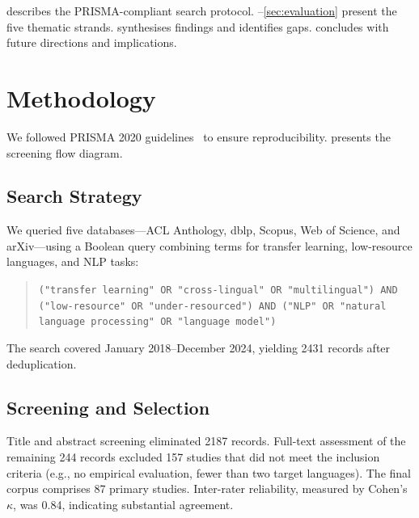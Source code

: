 \documentclass[
    language=english,
    doctype=article,
    institution=none,
    titlestyle=book,
]{../../omnilatex}
\begin{document}
 describes the PRISMA-compliant search protocol.
--\ref{sec:evaluation} present the five thematic
strands.   synthesises findings and identifies gaps.
 concludes with future directions and implications.

\section{Methodology}
\label{sec:methodology}
We followed PRISMA 2020 guidelines~\cite{page2021prisma} to ensure
reproducibility.   presents the screening flow diagram.

\subsection{Search Strategy}
We queried five databases---ACL Anthology, dblp, Scopus, Web of Science, and
arXiv---using a Boolean query combining terms for transfer learning, low-resource
languages, and NLP tasks:

\begin{quote}
\texttt{("transfer learning" OR "cross-lingual" OR "multilingual") AND
("low-resource" OR "under-resourced") AND ("NLP" OR "natural language
processing" OR "language model")}
\end{quote}

The search covered January 2018--December 2024, yielding 2431 records after
deduplication.

\subsection{Screening and Selection}
Title and abstract screening eliminated 2187 records.  Full-text assessment of
the remaining 244 records excluded 157 studies that did not meet the inclusion
criteria (e.g., no empirical evaluation, fewer than two target languages).  The
final corpus comprises 87 primary studies.  Inter-rater reliability, measured
by Cohen's $\kappa$, was 0.84, indicating substantial agreement.
\end{document}
